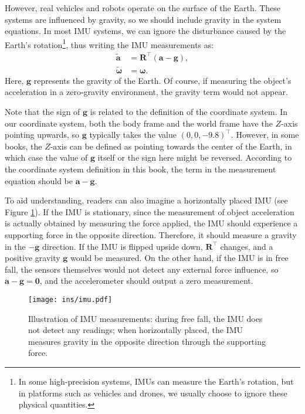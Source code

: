 However, real vehicles and robots operate on the surface of the Earth. These systems are influenced by gravity, so we should include gravity in the system equations. In most IMU systems, we can ignore the disturbance caused by the Earth's rotation\footnote{In some high-precision systems, IMUs can measure the Earth's rotation, but in platforms such as vehicles and drones, we usually choose to ignore these physical quantities.}, thus writing the IMU measurements as:
\begin{subequations}\label{eq:3.2}
	\begin{align}
		\tilde{\mathbf{a}} &= \mathbf{R}^\top (\mathbf{a} - \mathbf{g}), \\
		\tilde{\boldsymbol{\omega}} &= \boldsymbol{\omega}.
	\end{align}
\end{subequations}
Here, $\mathbf{g}$ represents the gravity of the Earth. Of course, if measuring the object's acceleration in a zero-gravity environment, the gravity term would not appear.

Note that the sign of $\mathbf{g}$ is related to the definition of the coordinate system. In our coordinate system, both the body frame and the world frame have the $Z$-axis pointing upwards, so $\mathbf{g}$ typically takes the value $(0, 0, -9.8)^\top$. However, in some books, the $Z$-axis can be defined as pointing towards the center of the Earth, in which case the value of $\mathbf{g}$ itself or the sign here might be reversed. According to the coordinate system definition in this book, the term in the measurement equation should be $\mathbf{a}-\mathbf{g}$.

To aid understanding, readers can also imagine a horizontally placed IMU (see Figure \ref{fig:imu}). If the IMU is stationary, since the measurement of object acceleration is actually obtained by measuring the force applied, the IMU should experience a supporting force in the opposite direction. Therefore, it should measure a gravity in the $-\mathbf{g}$ direction. If the IMU is flipped upside down, $\mathbf{R}^\top$ changes, and a positive gravity $\mathbf{g}$ would be measured. On the other hand, if the IMU is in free fall, the sensors themselves would not detect any external force influence, so $\mathbf{a}-\mathbf{g}=\mathbf{0}$, and the accelerometer should output a zero measurement.

\begin{figure}
	\centering
	\texttt{[image: ins/imu.pdf]}
	\caption{Illustration of IMU measurements: during free fall, the IMU does not detect any readings; when horizontally placed, the IMU measures gravity in the opposite direction through the supporting force.}
	\label{fig:imu}
\end{figure}

